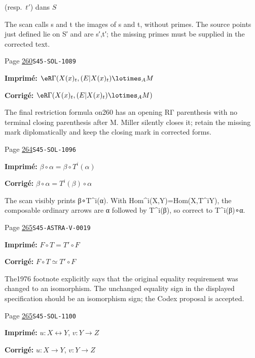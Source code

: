 \begin{description}
(resp.\ $t'$) dans $S$
\par\noindent The scan calls s and t the images of s and t, without primes. The source points just defined lie on S′ and are s′,t′; the missing primes must be supplied in the corrected text.
\smallskip
\item[\hypertarget{apparatus:FR-0271}{271}] Page \hyperlink{printpage:fr:260}{260}\quad\texttt{S45-SOL-1089}
\par\noindent\textbf{Imprimé:} \(\eR\Gamma(X(x)_t,(E|X(x)_t)\lotimes_A M\)
\par\noindent\textbf{Corrigé:} \(\eR\Gamma(X(x)_t,(E|X(x)_t)\lotimes_A M)\)
\par\noindent The final restriction formula on260 has an opening RΓ parenthesis with no terminal closing parenthesis after M. Miller silently closes it; retain the missing mark diplomatically and keep the closing mark in corrected forms.
\smallskip
\item[\hypertarget{apparatus:FR-0272}{272}] Page \hyperlink{printpage:fr:264}{264}\quad\texttt{S45-SOL-1096}
\par\noindent\textbf{Imprimé:} \(\beta\circ \alpha = \beta\circ T^i(\alpha)\)
\par\noindent\textbf{Corrigé:} \(\beta\circ \alpha = T^i(\beta)\circ\alpha\)
\par\noindent The scan visibly prints β∘T\textasciicircum{}i(α). With Hom\textasciicircum{}i(X,Y)=Hom(X,T\textasciicircum{}iY), the composable ordinary arrows are α followed by T\textasciicircum{}i(β), so correct to T\textasciicircum{}i(β)∘α.
\smallskip
\item[\hypertarget{apparatus:FR-0273}{273}] Page \hyperlink{printpage:fr:265}{265}\quad\texttt{S45-ASTRA-V-0019}
\par\noindent\textbf{Imprimé:} \(F\circ T = T'\circ F\)
\par\noindent\textbf{Corrigé:} \(F\circ T \simeq T'\circ F\)
\par\noindent The1976 footnote explicitly says that the original equality requirement was changed to an isomorphism. The unchanged equality sign in the displayed specification should be an isomorphism sign; the Codex proposal is accepted.
\smallskip
\item[\hypertarget{apparatus:FR-0274}{274}] Page \hyperlink{printpage:fr:265}{265}\quad\texttt{S45-SOL-1100}
\par\noindent\textbf{Imprimé:} $u:X\leftrightarrow Y$, $v:Y\to Z$
\par\noindent\textbf{Corrigé:} $u:X\to Y$, $v:Y\to Z$

\end{description}
